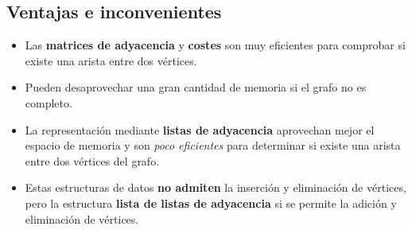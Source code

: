 \subsection*{Ventajas e inconvenientes}
\begin{itemize}
  \item Las \textbf{matrices de adyacencia} y \textbf{costes} son muy eficientes para comprobar si existe una arista entre dos vértices.
  \item Pueden desaprovechar una gran cantidad de memoria si el grafo no es completo.
  \item La representación mediante \textbf{listas de adyacencia} aprovechan mejor el espacio de memoria y son \textit{poco eficientes} para determinar si existe una arista entre dos vértices del grafo.
  \item Estas estructuras de datos \textbf{no admiten} la inserción y eliminación de vértices, pero la estructura \textbf{lista de listas de adyacencia} si se permite la adición y eliminación de vértices.
\end{itemize}
